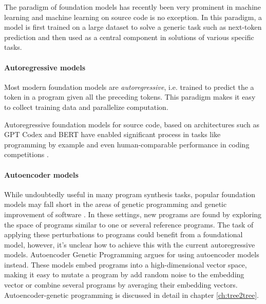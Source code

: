The paradigm of foundation models \cite{foundation-models} has recently been very prominent in machine learning and machine learning on source code is no exception.
In this paradigm, a model is first trained on a large dataset to solve a generic task such as next-token prediction and then used as a central component in solutions of various specific tasks.


\paragraph{Autoregressive models}

Most modern foundation models are \emph{autoregressive}, i.e. trained to predict the a token in a program given all the preceding tokens.
This paradigm makes it easy to collect training data and parallelize computation.


Autoregressive foundation models for source code, based on architectures such as GPT Codex \cite{radfordImprovingLanguageUnderstanding,chenEvaluatingLargeLanguage2021,codegen,gpt-neo} and BERT \cite{devlinBERTPretrainingDeep2019,codebert} have enabled significant process in tasks like programming by example \cite{halbertProgrammingExample1984} and even human-comparable performance in coding competitions \cite{liCompetitionLevelCodeGeneration2022}.

\paragraph{Autoencoder models}

While undoubtedly useful in many program synthesis tasks, popular foundation models may fall short in the areas of genetic programming \cite{genprogast} and genetic improvement of software \cite{petke2018:genetic}.
In these settings, new programs are found by exploring the space of programs similar to one or several reference programs.
The task of applying these perturbations to programs could benefit from a foundational model, however, it's unclear how to achieve this with the current autoregressive models.
Autoencoder Genetic Programming \cite{autoenc-gp,denoising-autoenc-gp,latentspaceopt} argues for using autoencoder \cite{autoencoders} models instead.
These models embed programs into a high-dimensional vector space, making it easy to mutate a program by add random noise to the embedding vector or combine several programs by averaging their embedding vectors.
Autoencoder-genetic programming is discussed in detail in chapter \ref{ch:tree2tree}.

